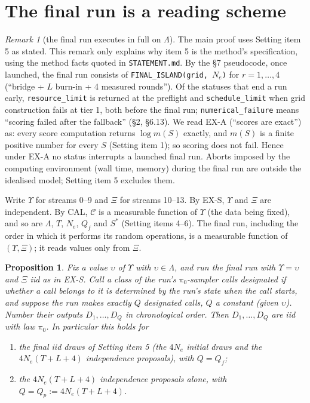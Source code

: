 \documentclass[11pt]{article}
\newtheorem{proposition}[theorem]{Proposition}
\theoremstyle{remark}
\newtheorem{remark}[theorem]{Remark}
\newcommand{\cC}{\mathcal{C}}
\newcommand{\1}{\mathbf{1}}
\begin{document}
\section{The final run is a reading scheme}

\begin{remark}[the final run executes in full on $\Lambda$]\label{rem:full}
The main proof uses Setting item 5 as stated. This remark only explains why item 5 is the method's specification,
using the method facts quoted in \texttt{STATEMENT.md}. By the \S7 pseudocode, once launched, the final run consists of
\texttt{FINAL\_ISLAND(grid, $N_e$)} for $r=1,\dots,4$ (``bridge + $L$ burn-in + 4 measured rounds''). Of the statuses
that end a run early, \texttt{resource\_limit} is returned at the preflight and \texttt{schedule\_limit} when grid
construction fails at tier 1, both before the final run; \texttt{numerical\_failure} means ``scoring failed after the
fallback'' (\S2, \S6.13). We read EX-A (``scores are exact'') as: every score computation returns
$\log m(S)$ exactly, and $m(S)$ is a finite positive number for every $S$ (Setting item 1); so scoring does not fail. Hence under EX-A no status interrupts a launched final run.
Aborts imposed by the computing environment (wall time, memory) during the final run are outside the idealised model;
Setting item 5 excludes them.
\end{remark}

Write $\Upsilon$ for streams 0--9 and $\Xi$ for streams 10--13. By EX-S, $\Upsilon$ and $\Xi$ are independent. By CAL,
$\cC$ is a measurable function of $\Upsilon$ (the data being fixed), and so are $\Lambda$, $T$, $N_e$, $Q_f$ and $S^*$
(Setting items 4--6). The final run, including the order in which it performs its random operations, is a measurable
function of $(\Upsilon,\Xi)$; it reads values only from $\Xi$.

\begin{proposition}\label{prop:iid}
Fix a value $\upsilon$ of $\Upsilon$ with $\upsilon\in\Lambda$, and run the final run with $\Upsilon=\upsilon$ and
$\Xi$ iid as in EX-S. Call a class of the run's $\pi_0$-sampler calls \emph{designated} if whether a call belongs to it
is determined by the run's state when the call starts, and suppose the run makes exactly $Q$ designated calls, $Q$ a
constant (given $\upsilon$). Number their outputs $D_1,\dots,D_Q$ in chronological order. Then $D_1,\dots,D_Q$ are iid
with law $\pi_0$. In particular this holds for
\begin{enumerate}[label=(\alph*)]
\item the final iid draws of Setting item 5 (the $4N_e$ initial draws and the $4N_e(T+L+4)$ independence proposals),
with $Q=Q_f$;
\item the $4N_e(T+L+4)$ independence proposals alone, with $Q=Q_p:=4N_e(T+L+4)$.
\end{enumerate}
\end{proposition}
\end{document}

